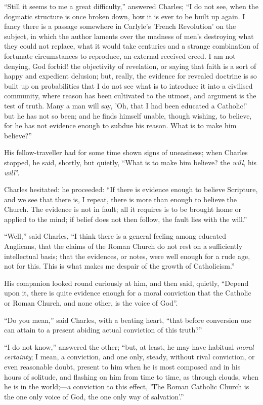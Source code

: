 ``Still it seems to me a great difficulty,'' answered
Charles; ``I do not see, when the dogmatic structure is once
broken down, how it is ever to be built up again. I fancy there is a
passage somewhere in Carlyle's 'French Revolution' on the subject, in
which the author laments over the madness of men's destroying what
they could not replace, what it would take centuries and a strange
combination of fortunate circumstances to reproduce, an external
received creed. I am not denying, God forbid! the objectivity of
revelation, or saying that faith is a sort of happy and expedient
delusion; but, really, the evidence for revealed doctrine is so built
up on probabilities that I do not see what is to introduce it into a
civilised community, where reason has been cultivated to the utmost,
and argument is the test of truth. Many a man will say, 'Oh, that I
had been educated a Catholic!' but he has not so been; and he finds himself unable, though wishing, to believe, for he has not
evidence enough to subdue his reason. What is to make him
believe?''

His fellow-traveller had for some time shown signs of uneasiness;
when Charles stopped, he said, shortly, but quietly, ``What is to
make him believe? the \emph{will}, his \emph{will}''.

Charles hesitated: he proceeded: ``If there is evidence enough
to believe Scripture, and we see that there is, I repeat, there is
more than enough to believe the Church. The evidence is not in fault;
all it requires is to be brought home or applied to the mind; if
belief does not then follow, the fault lies with the will.''

``Well,'' said Charles, ``I think there is a general
feeling among educated Anglicans, that the claims of the Roman Church
do not rest on a sufficiently intellectual basis; that the evidences,
or notes, were well enough for a rude age, not for this. This is what
makes me despair of the growth of Catholicism.''

His companion looked round curiously at him, and then said,
quietly, ``Depend upon it, there is quite evidence enough for a
moral conviction that the Catholic or Roman Church, and none other, is
the voice of God''.

``Do you mean,'' said Charles, with a beating heart,
``that before conversion one can attain to a present abiding
actual conviction of this truth?''

``I do not know,'' answered the other; ``but, at least,
he may have habitual \emph{moral certainty}; I mean, a conviction, and
one only, steady, without rival conviction, or even reasonable doubt,
present to him when he is most composed and in his hours of
solitude, and flashing on him from time to time, as through clouds,
when he is in the world;—a conviction to this effect, 'The Roman
Catholic Church is the one only voice of God, the one only way of
salvation'.''

